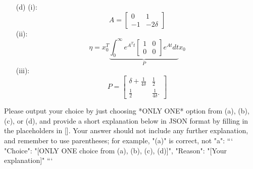 \documentclass[12pt]{article}
\begin{document}
\begin{itemize}
\begin{equation}
\end{equation}
(ii): 
    \begin{equation}
    \eta = x_0^T \underbrace{\int_0^{\infty} e^{A^Tt} \begin{bmatrix}
        1 & 0 \\ 0 & 1
    \end{bmatrix} e^{At} dt}_{P} x_0
\end{equation}
(iii): 
\begin{equation}
    P = \begin{bmatrix}
        \delta + \frac{1}{4\delta} & \frac{1}{2} \\ \frac{1}{2} & \frac{1}{4\delta}.
    \end{bmatrix}
\end{equation}
    \item[(d)] (i):
\begin{equation}
     A = \begin{bmatrix}
        0 & 1\\
        -1 & -2\delta
    \end{bmatrix}
\end{equation}
(ii): 
    \begin{equation}
    \eta = x_0^T \underbrace{\int_0^{\infty} e^{A^Tt} \begin{bmatrix}
        1 & 0 \\ 0 & 0
    \end{bmatrix} e^{At} dt}_{P} x_0
\end{equation}
(iii): 
\begin{equation}
    P = \begin{bmatrix}
        \delta + \frac{1}{4\delta} & \frac{1}{2} \\ \frac{1}{2} & \frac{1}{4\delta}.
    \end{bmatrix}
\end{equation}
\end{itemize}

Please output your choice by just choosing *ONLY ONE* option from (a), (b), (c), or (d), and provide a short explanation below in JSON format by filling in the placeholders in []. Your answer should not include any further explanation, and remember to use parentheses; for example, "(a)" is correct, not "a":
```
{
"Choice": "[ONLY ONE choice from (a), (b), (c), (d)]",
"Reason": "[Your explanation]"
}
```
\end{document}
